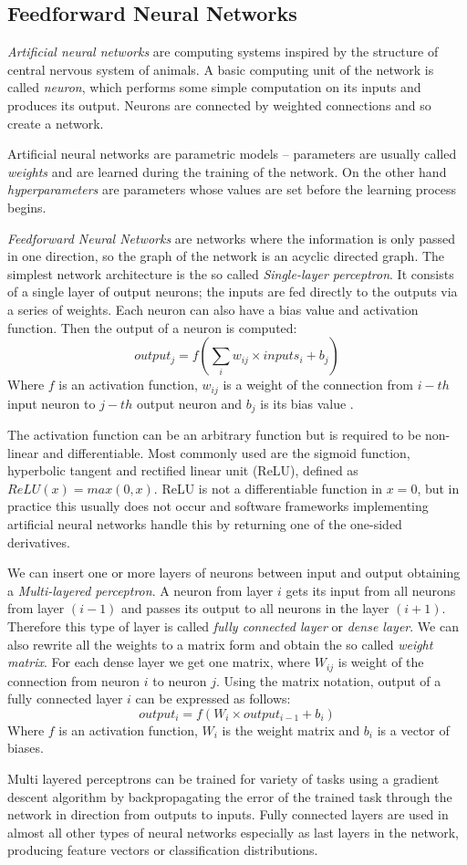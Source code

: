 \subsection{Feedforward Neural Networks}
\textit{Artificial neural networks} are computing systems inspired by the structure of central nervous system of animals. A basic computing unit of the network is called \textit{neuron}, which performs some simple computation on its inputs and produces its output. Neurons are connected by weighted connections and so create a network. \par
Artificial neural networks are parametric models -- parameters are usually called \textit{weights} and are learned during the training of the network. On the other hand \textit{hyperparameters} are parameters whose values are set before the learning process begins. \par
\textit{Feedforward Neural Networks} are networks where the information is only passed in one direction, so the graph of the network is an acyclic directed graph. The simplest network architecture is the so called \textit{Single-layer perceptron}. It consists of a single layer of output neurons; the inputs are fed directly to the outputs via a series of weights. Each neuron can also have a bias value and activation function. Then the output of a neuron is computed: $$output_j = f(\sum_{i} {w_{ij}\times inputs_i + b_j})$$ Where $f$ is an activation function, $w_{ij}$ is a weight of the connection from $i-th$ input neuron to $j-th$ output neuron and $b_j$ is its bias value .

The activation function can be an arbitrary function but is required to be non-linear and differentiable. Most commonly used are the sigmoid function, hyperbolic tangent and rectified linear unit (ReLU), defined as $ReLU(x) = max(0,x)$. ReLU is not a differentiable function in $x=0$, but in practice this usually does not occur and software frameworks implementing artificial neural networks handle this by returning one of the one-sided derivatives.\par  
We can insert one or more layers of neurons between input and output obtaining a \textit{Multi-layered perceptron}. A neuron from layer $i$ gets its input from all neurons from layer $(i-1)$ and passes its output to all neurons in the layer $(i+1)$. Therefore this type of layer is called \textit{fully connected layer} or \textit{dense layer}.  We can also rewrite all the weights to a matrix form and obtain the so called \textit{weight matrix}. For each dense layer we get one matrix, where $W_{ij}$ is weight of the connection from neuron $i$ to neuron $j$. Using the matrix notation, output of a fully connected layer $i$ can be expressed as follows: 
$$output_i = f(W_i \times output_{i-1} + b_i)$$
Where $f$ is an activation function, $W_i$ is the weight matrix and $b_i$ is a vector of biases.\par  
Multi layered perceptrons can be trained for variety of tasks using a gradient descent algorithm by backpropagating the error of the trained task through the network in direction from outputs to inputs. Fully connected layers are used in almost all other types of neural networks especially as last layers in the network, producing feature vectors or classification distributions.

